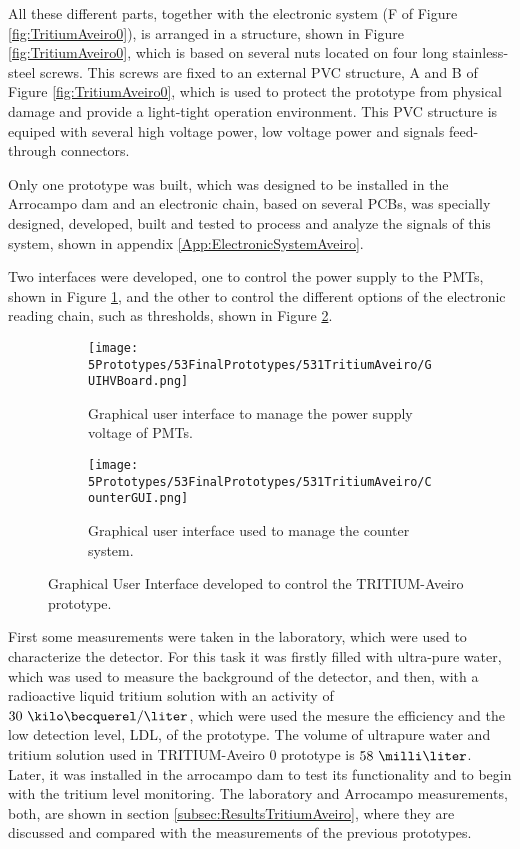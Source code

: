 All these different parts, together with the electronic system (F of Figure \ref{fig:TritiumAveiro0}), is arranged in a structure, shown in Figure \ref{fig:TritiumAveiro0}, which is based on several nuts located on four long stainless-steel screws. This screws are fixed to an external PVC structure, A and B of Figure \ref{fig:TritiumAveiro0}, which is used to protect the prototype from physical damage and provide a light-tight operation environment. This PVC structure is equiped with several high voltage power, low voltage power and signals feed-through connectors.

Only one prototype was built, which was designed to be installed in the Arrocampo dam and an electronic chain, based on several PCBs, was specially designed, developed, built and tested to process and analyze the signals of this system, shown in appendix \ref{App:ElectronicSystemAveiro}.

Two interfaces were developed, one to control the power supply to the PMTs, shown in Figure \ref{subfig:GUIHV}, and the other to control the different options of the electronic reading chain, such as thresholds, shown in Figure \ref{subfig:GUIcounts}.

\begin{figure}
\centering
    \begin{subfigure}[b]{0.65\textwidth}
    \centering
    \texttt{[image: 5Prototypes/53FinalPrototypes/531TritiumAveiro/GUIHVBoard.png]}  
    \caption{Graphical user interface to manage the power supply voltage of PMTs.\label{subfig:GUIHV}}
    \end{subfigure}
    \hfill
    \begin{subfigure}[b]{0.8\textwidth}
    \centering
    \texttt{[image: 5Prototypes/53FinalPrototypes/531TritiumAveiro/CounterGUI.png]}  
    \caption{Graphical user interface used to manage the counter system.\label{subfig:GUIcounts}}
    \end{subfigure}
 \caption{Graphical User Interface developed to control the TRITIUM-Aveiro prototype.}
 \label{fig:GUITRITIUMAveiro}
\end{figure}

First some measurements were taken in the laboratory, which were used to characterize the detector. For this task it was firstly filled with ultra-pure water, which was used to measure the background of the detector, and then, with a radioactive liquid tritium solution with an activity of $30~\kilo\becquerel/\liter$, which were used the mesure the efficiency and the low detection level, LDL, of the prototype. The volume of ultrapure water and tritium solution used in TRITIUM-Aveiro 0 prototype is $58~\milli\liter$. Later, it was installed in the arrocampo dam to test its functionality and to begin with the tritium level monitoring. The laboratory and Arrocampo measurements, both, are shown in section \ref{subsec:ResultsTritiumAveiro}, where they are discussed and compared with the measurements of the previous prototypes.
